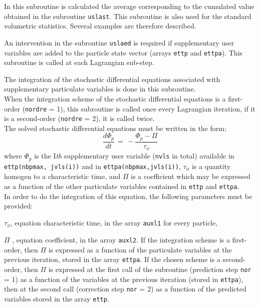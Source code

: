 {{\noindent
In this subroutine is calculated the average corresponding to the
cumulated value obtained in the subroutine \texttt{uslast}. This subroutine is
also used for the standard volumetric statistics. Several examples are
therefore described.




\noindent
An intervention in the subroutine \texttt{uslaed} is required if supplementary user
variables are added to the particle state vector (arrays \texttt{ettp}
and \texttt{ettpa}). This subroutine is called at each Lagrangian sub-step.

\noindent
The integration of the stochastic differential equations associated with
supplementary particulate variables is done in this subroutine. \\
When the integration scheme of the stochastic differential equations is
a first-order (\texttt{nordre} = 1), this subroutine is called once every
Lagrangian iteration, if it is a second-order (\texttt{nordre} = 2), it is called
twice. \\

\noindent
The solved stochastic differential equations must be written in the
form:
\begin{displaymath}
\frac{d \Phi_p}{dt} \,=\, - \frac{\Phi_p - \Pi}{\tau_\phi}
\end{displaymath}
where $\Phi_p$ is the I\textit{th} supplementary user variable (\texttt{nvls} in
total) available in \texttt{ettp(nbpmax, jvls(i))} and in
 \texttt{ettpa(nbpmax,jvls(i))},
$\tau_\phi$ is a quantity homogen to a characteristic time, and $\Pi$ is
a coefficient which may be expressed as a function of the other
particulate variables contained in \texttt{ettp} and \texttt{ettpa}. \\
In order to do the integration of this equation, the following
parameters must be provided:
\begin{list}{-}{}
\item $\tau_\phi$, equation characteristic time, in the array \texttt{auxl1} for
      every particle,
\item $\Pi$ , equation coefficient, in the array \texttt{auxl2}. If the
      integration scheme is a first-order, then $\Pi$ is expressed as a
      function of the particulate variables at the previous iteration,
      stored in the array \texttt{ettpa}. If the chosen scheme is a second-order,
      then $\Pi$ is expressed at the first call of the subroutine
      (prediction step \texttt{nor} = 1) as a function of the variables at the
      previous iteration (stored in \texttt{ettpa}), then at the second call
      (correction step \texttt{nor} = 2) as a function of the predicted variables
      stored in the array \texttt{ettp}.
\end{list}

}}
